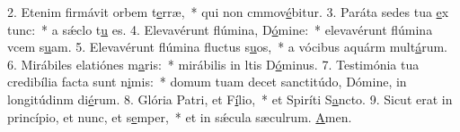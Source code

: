 2. Etenim firmávit orbem t\uline{e}rræ,~* qui non cmmov\uline{é}bitur.
3. Paráta sedes tua \uline{e}x tunc:~* a sǽclo t\uline{u} es.
4. Elevavérunt flúmina, D\uline{ó}mine:~* elevavérunt flúmina vcem s\uline{u}am.
5. Elevavérunt flúmina fluctus s\uline{u}os,~* a vócibus aquárm mult\uline{á}rum.
6. Mirábiles elatiónes m\uline{a}ris:~* mirábilis in ltis D\uline{ó}minus.
7. Testimónia tua credibília facta sunt n\uline{i}mis:~* domum tuam decet sanctitúdo, Dómine, in longitúdinm di\uline{é}rum.
8. Glória Patri, et F\uline{í}lio,~* et Spiríti S\uline{a}ncto.
9. Sicut erat in princípio, et nunc, et s\uline{e}mper,~* et in sǽcula sæculrum. \uline{A}men.
